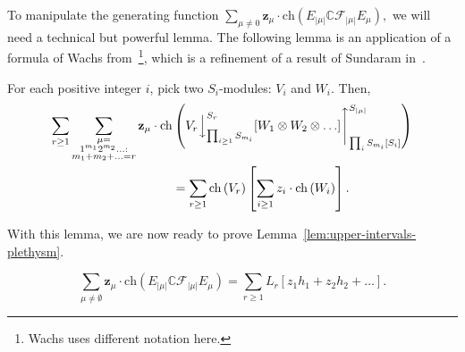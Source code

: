 \documentclass[ALCO, Unicode]{cedram}
\def\ch{\mathrm{ch}}
\def\C{{\mathbb{C}}}
\def\ch{\mathrm{ch}}
\begin{document}
To manipulate the generating function $\sum_{\mu \neq 0}\mathbf{z}_\mu \cdot \ch\left(E_{|\mu|}\C\mathcal{F}_{|\mu|}E_\mu\right),$ we will need a technical but powerful lemma. The following lemma is an application of a formula of Wachs from~\cite[Theorem 5.5]{WachsWhitneyHomology}\footnote{Wachs uses different notation here.}, which is a refinement of a result of Sundaram in~\cite[Lemma 1.5]{SundaramAdvances}.
\begin{lemma}\label{lem:Wachs-plethysm-gen-fn}
For each positive integer $i$, pick two $S_i$-modules: $V_i$ and $W_i.$ Then,
\begin{align*}
    \sum_{r \geq 1}\sum_{\substack{\mu =\\ 1^{m_1} 2^{m_2} \ldots:\\ m_1 + m_2 + \ldots = r} }\mathbf{z}_\mu \cdot \ch &\left(V_r \Big \downarrow_{\prod_{i \geq 1} S_{m_i}}^{S_r} [W_1 \otimes W_2 \otimes \ldots ]\Bigg \uparrow_{\prod_iS_{m_i}[S_i]}^{S_{|\mu|}}\right)\\ &= \sum_{r \geq 1} \ch\left(V_r\right)\left[\sum_{i \geq 1} z_i \cdot \ch\left(W_i\right)\right].
\end{align*}
\end{lemma}
With this lemma, we are now ready to prove Lemma~\ref{lem:upper-intervals-plethysm}. 
\begin{lemma} \label{lem:upper-intervals-plethysm}
    \[\sum_{\mu \neq \emptyset} \mathbf{z}_\mu \cdot \ch \left(E_{|\mu|}\C \mathcal{F}_{|\mu|}E_\mu \right)  = \sum_{r \geq 1} L_r[z_1h_1 + z_2h_2  + \ldots].\]
\end{lemma}
\end{document}

